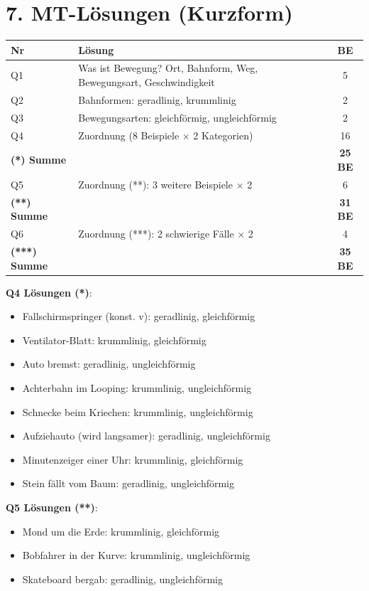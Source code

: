 \documentclass[11pt, a4paper]{article}
\begin{document}
\section*{7. MT-Lösungen (Kurzform)}

\begin{tabular}{|l|p{7cm}|c|}
\hline
\textbf{Nr} & \textbf{Lösung} & \textbf{BE} \\
\hline
Q1 & Was ist Bewegung? Ort, Bahnform, Weg, Bewegungsart, Geschwindigkeit & 5 \\
\hline
Q2 & Bahnformen: geradlinig, krummlinig & 2 \\
\hline
Q3 & Bewegungsarten: gleichförmig, ungleichförmig & 2 \\
\hline
Q4 & Zuordnung (8 Beispiele $\times$ 2 Kategorien) & 16 \\
\hline
\textbf{(*) Summe} & & \textbf{25 BE} \\
\hline
Q5 & Zuordnung (**): 3 weitere Beispiele $\times$ 2 & 6 \\
\hline
\textbf{(**) Summe} & & \textbf{31 BE} \\
\hline
Q6 & Zuordnung (***): 2 schwierige Fälle $\times$ 2 & 4 \\
\hline
\textbf{(***) Summe} & & \textbf{35 BE} \\
\hline
\end{tabular}

\vspace{0.5em}

\textbf{Q4 Lösungen (*)}:
\begin{itemize}[itemsep=1pt]
    \item Fallschirmspringer (konst. v): geradlinig, gleichförmig
    \item Ventilator-Blatt: krummlinig, gleichförmig
    \item Auto bremst: geradlinig, ungleichförmig
    \item Achterbahn im Looping: krummlinig, ungleichförmig
    \item Schnecke beim Kriechen: krummlinig, ungleichförmig
    \item Aufziehauto (wird langsamer): geradlinig, ungleichförmig
    \item Minutenzeiger einer Uhr: krummlinig, gleichförmig
    \item Stein fällt vom Baum: geradlinig, ungleichförmig
\end{itemize}

\textbf{Q5 Lösungen (**)}:
\begin{itemize}[itemsep=1pt]
    \item Mond um die Erde: krummlinig, gleichförmig
    \item Bobfahrer in der Kurve: krummlinig, ungleichförmig
    \item Skateboard bergab: geradlinig, ungleichförmig
\end{itemize}
\end{document}
